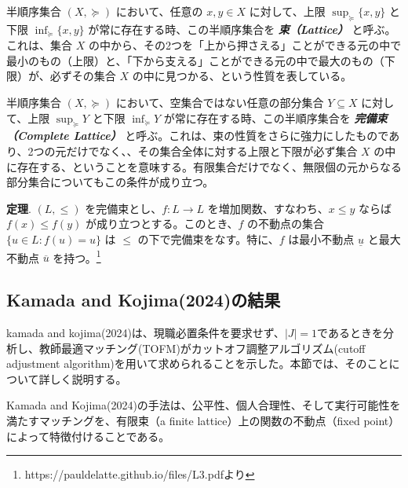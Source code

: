 \documentclass[12pt, a4paper]{article}
\theoremstyle{definition}
\theoremstyle{remark}
\theoremstyle{plain}
\begin{document}
半順序集合 $(X, \succeq)$ において、任意の $x, y \in X$ に対して、上限 $\sup_{\succeq} \{x, y\}$ と下限 $\inf_{\succeq} \{x, y\}$ が常に存在する時、この半順序集合を \textbf{\textit{束（Lattice）}} と呼ぶ。これは、集合 $X$ の中から、その2つを「上から押さえる」ことができる元の中で最小のもの（上限）と、「下から支える」ことができる元の中で最大のもの（下限）が、必ずその集合 $X$ の中に見つかる、という性質を表している。


半順序集合 $(X, \succeq)$ において、空集合ではない任意の部分集合 $Y \subseteq X$ に対して、上限 $\sup_{\succeq} Y$ と下限 $\inf_{\succeq} Y$ が常に存在する時、この半順序集合を \textbf{\textit{完備束（Complete Lattice）}} と呼ぶ。これは、束の性質をさらに強力にしたものであり、2つの元だけでなく、、その集合全体に対する上限と下限が必ず集合 $X$ の中に存在する、ということを意味する。有限集合だけでなく、無限個の元からなる部分集合についてもこの条件が成り立つ。


\textbf{定理}. $(L, \leq)$ を完備束とし、$f: L \to L$ を増加関数、すなわち、$x \leq y$ ならば $f(x) \leq f(y)$ が成り立つとする。このとき、$f$ の不動点の集合 $\{ u \in L : f(u) = u \}$ は $\leq$ の下で完備束をなす。特に、$f$ は最小不動点 $\underline{u}$ と最大不動点 $\overline{u}$ を持つ。\footnote{https://pauldelatte.github.io/files/L3.pdfより}

\bigbreak


\subsection{Kamada and Kojima(2024)の結果}
kamada and kojima(2024)は、現職必置条件を要求せず、$|J| = 1$であるときを分析し、教師最適マッチング(TOFM)がカットオフ調整アルゴリズム(cutoff adjustment algorithm)を用いて求められることを示した。本節では、そのことについて詳しく説明する。




Kamada and Kojima(2024)の手法は、公平性、個人合理性、そして実行可能性を満たすマッチングを、有限束（a finite lattice）上の関数の不動点（fixed point）によって特徴付けることである。
\end{document}
